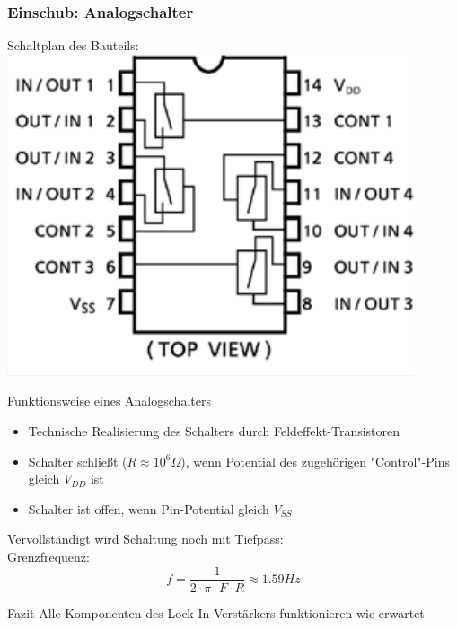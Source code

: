\documentclass[compress,11pt]{beamer}
\begin{document}
\subsubsection{Einschub: Analogschalter}
\begin{frame}
Schaltplan des Bauteils:\\
\includegraphics[width=.7\textwidth]{schalt/analog}
\end{frame}
\begin{frame}
\begin{block}{Funktionsweise eines Analogschalters}
\begin{itemize}
\item Technische Realisierung des Schalters durch Feldeffekt-Transistoren
\item Schalter schließt ($R \approx 10^6 \Omega$), wenn Potential des zugehörigen "Control"-Pins gleich $V_{DD}$ ist
\item Schalter ist offen, wenn Pin-Potential gleich $V_{SS}$
\end{itemize}
\end{block}
\end{frame}
\begin{frame}
Vervollständigt wird Schaltung noch mit Tiefpass:\\
Grenzfrequenz:
\begin{equation}
f = \frac{1}{2 \cdot \pi \cdot F \cdot R} \approx 1.59 Hz
\end{equation}
\begin{block}{Fazit}
Alle Komponenten des Lock-In-Verstärkers funktionieren wie erwartet
\end{block}
\end{frame}
\end{document}
